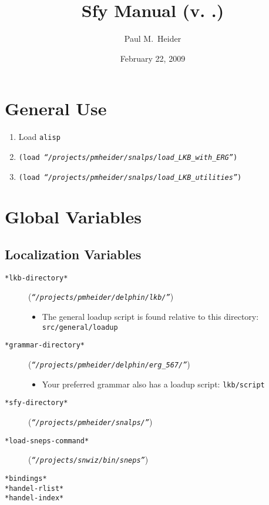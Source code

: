 \documentclass{article}
\title{Sfy Manual (v. \themajorversion.\theminorversion)}
\author{Paul M.\ Heider}
\date{February 22, 2009}
\newcommand{\com}[1]{\texttt{#1}}
\newcommand{\var}[1]{\texttt{#1}}
\newcommand{\val}[1]{\texttt{\textsl{#1}}}
\begin{document}
\maketitle

\section{General Use}

  \begin{enumerate}
    \item Load \com{alisp}
    \item \com{(load \val{``/projects/pmheider/snalps/load\_LKB\_with\_ERG''})}
    \item \com{(load \val{``/projects/pmheider/snalps/load\_LKB\_utilities''})}
  \end{enumerate}

\section{Global Variables}

\subsection{Localization Variables}

  \begin{description}
    \item[\var{*lkb-directory*}] (\val{``/projects/pmheider/delphin/lkb/''})
      \begin{itemize}
        \item The general loadup script is found relative to this directory:  \texttt{src/general/loadup}
      \end{itemize}
    \item[\var{*grammar-directory*}] (\val{``/projects/pmheider/delphin/erg\_567/''})
      \begin{itemize}
        \item Your preferred grammar also has a loadup script:  \texttt{lkb/script}
      \end{itemize}
    \item[\var{*sfy-directory*}] (\val{``/projects/pmheider/snalps/''})
    \item[\var{*load-sneps-command*}] (\val{``/projects/snwiz/bin/sneps''})
    \item[\var{*bindings*}]
    \item[\var{*handel-rlist*}]
    \item[\var{*handel-index*}]
  \end{description}
\end{document}
